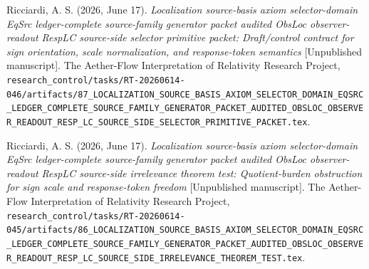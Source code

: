 \documentclass[11pt]{article}
\begin{document}
Ricciardi, A. S. (2026, June 17). \emph{Localization source-basis
axiom selector-domain EqSrc ledger-complete source-family generator
packet audited ObsLoc observer-readout RespLC source-side selector
primitive packet: Draft/control contract for sign orientation, scale
normalization, and response-token semantics} [Unpublished manuscript].
The Aether-Flow Interpretation of Relativity Research Project,
\texttt{research\_control/tasks/RT-20260614-046/artifacts/87\_LOCALIZATION\_SOURCE\_BASIS\_AXIOM\_SELECTOR\_DOMAIN\_EQSRC\_LEDGER\_COMPLETE\_SOURCE\_FAMILY\_GENERATOR\_PACKET\_AUDITED\_OBSLOC\_OBSERVER\_READOUT\_RESP\_LC\_SOURCE\_SIDE\_SELECTOR\_PRIMITIVE\_PACKET.tex}.

Ricciardi, A. S. (2026, June 17). \emph{Localization source-basis
axiom selector-domain EqSrc ledger-complete source-family generator
packet audited ObsLoc observer-readout RespLC source-side irrelevance
theorem test: Quotient-burden obstruction for sign scale and
response-token freedom} [Unpublished manuscript]. The Aether-Flow
Interpretation of Relativity Research Project,
\texttt{research\_control/tasks/RT-20260614-045/artifacts/86\_LOCALIZATION\_SOURCE\_BASIS\_AXIOM\_SELECTOR\_DOMAIN\_EQSRC\_LEDGER\_COMPLETE\_SOURCE\_FAMILY\_GENERATOR\_PACKET\_AUDITED\_OBSLOC\_OBSERVER\_READOUT\_RESP\_LC\_SOURCE\_SIDE\_IRRELEVANCE\_THEOREM\_TEST.tex}.
\end{document}
